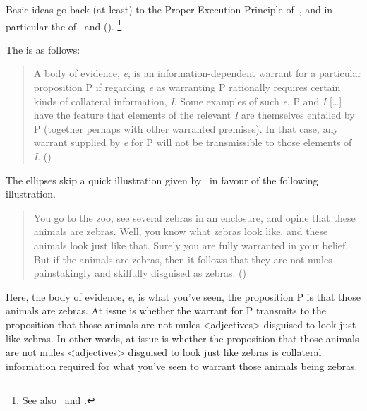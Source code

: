 \begin{note}
  Basic ideas go back (at least) to the Proper Execution Principle of~\textcite{Wright:1991vn}, and in particular the \widt{} of~\textcite{Wright:2000tq} and (\Citeyear{Wright:2003aa}).\nolinebreak
  \footnote{See also~\textcite{Wright:1986ug,Wright:2002uk} and \textcite{Wright:2004uo}.}

  The \widt{} is as follows:
  \begin{quote}
    A body of evidence, \emph{e}, is an information-dependent warrant for a particular proposition P if regarding \emph{e} as warranting P rationally requires certain kinds of collateral information, \emph{I}.
    Some examples of such \emph{e}, P and \emph{I} [\dots] have the feature that elements of the relevant \emph{I} are themselves entailed by P (together perhaps with other warranted premises).
    In that case, any warrant supplied by \emph{e} for P will not be transmissible to those elements of \emph{I}.\nolinebreak
    \mbox{}\hfill\mbox{(\Citeyear[143]{Wright:2000tq})}
  \end{quote}

  The ellipses skip a quick illustration given by~\citeauthor{Wright:2000tq} in favour of the following illustration.
  \begin{quote}
    \vspace{-\baselineskip}
    \begin{illustration}
      You go to the zoo, see several zebras in an enclosure, and opine that these animals are zebras.
      Well, you know what zebras look like, and these animals look just like that.
      Surely you are fully warranted in your belief.
      But if the animals are zebras, then it follows that they are not mules painstakingly and skilfully disguised as zebras.\linebreak
      \mbox{}\hfill\mbox{(\Citeyear[154]{Wright:2000tq})}
      \newline\mbox{ }
    \end{illustration}
  \end{quote}

  Here, the body of evidence, \emph{e}, is what you've seen, the proposition P is that those animals are zebras.
  At issue is whether the warrant for P transmits to the proposition that those animals are not mules <adjectives> disguised to look just like zebras.
  In other words, at issue is whether the proposition that those animals are not mules <adjectives> disguised to look just like zebras is collateral information required for what you've seen to warrant those animals being zebras.


\end{note}
